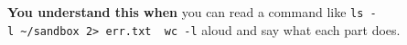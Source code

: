 \begin{understandbox}

\textbf{You understand this when} you can read a command like \texttt{ls\ -}\allowbreak{}\texttt{l\ \textasciitilde{}/}\allowbreak{}\texttt{sandbox\ 2\textgreater{}\ err.}\allowbreak{}\texttt{txt\ \textbar{}\ wc\ -}\allowbreak{}\texttt{l} aloud and say what each part does.

\end{understandbox}
